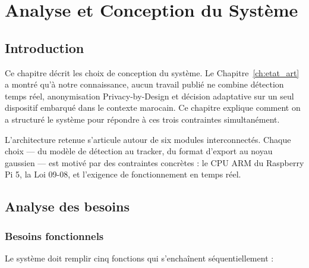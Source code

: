 \chapter{Analyse et Conception du Système}
\label{ch:conception}

\section*{Introduction}
{}

Ce chapitre décrit les choix de conception
du système. Le Chapitre~\ref{ch:etat_art}
a montré qu'à notre connaissance, aucun travail
publié ne combine détection temps réel,
anonymisation Privacy-by-Design et décision
adaptative sur un seul dispositif embarqué
dans le contexte marocain. Ce chapitre explique
comment on a structuré le système pour répondre
à ces trois contraintes simultanément.

L'architecture retenue s'articule autour de
six modules interconnectés. Chaque choix —
du modèle de détection au tracker, du format
d'export au noyau gaussien — est motivé par
des contraintes concrètes : le CPU ARM du
Raspberry Pi 5, la Loi 09-08, et l'exigence
de fonctionnement en temps réel.

\section{Analyse des besoins}

\subsection{Besoins fonctionnels}

Le système doit remplir cinq fonctions
qui s'enchaînent séquentiellement :

